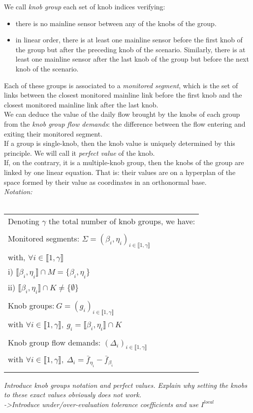 We call \emph{knob group} each set of knob indices verifying:
\begin{itemize}
	\item there is no mainline sensor between any of the knobs of the group.
	\item in linear order, there is at least one mainline sensor before the first knob of the group but after the preceding knob of the scenario. Similarly, there is at least one mainline sensor after the last knob of the group but before the next knob of the scenario.
\end{itemize}
Each of these groups is associated to a \emph{monitored segment}, which is the set of links between the closest monitored mainline link before the first knob and the closest monitored mainline link after the last knob.\\
We can deduce the value of the daily flow brought by the knobs of each group from the \emph{knob group flow demands}: the difference between the flow entering and exiting their monitored segment.\\
If a group is single-knob, then the knob value is uniquely determined by this principle. We will call it \emph{perfect value} of the knob.\\
If, on the contrary, it is a multiple-knob group, then the knobs of the group are linked by one linear equation. That is: their values are on a hyperplan of the space formed by their value as coordinates in an orthonormal base.\\
\emph{Notation:}\\
\\
\begin{tabular}{l}
	Denoting $\gamma$ the total number of knob groups, we have:\\
	\\

	Monitored segments: $\Sigma =(\beta_{i},\eta_{i})_{i \in \llbracket 1,\gamma \rrbracket} $ \\
	with, $\forall i\in \llbracket 1, \gamma \rrbracket $\\
		i) $ \llbracket \beta_{i},\eta_{i} \rrbracket \cap M=\{\beta_{i},\eta_{i}\} $\\
		ii)  $\llbracket \beta_{i}, \eta_{i} \rrbracket \cap K\not= \{\emptyset \}$\\
	\\
		Knob groups:$\ G=(g_{i})_{i\in \llbracket 1,\gamma \rrbracket}$\\
	with $\forall i \in \llbracket 1, \gamma \rrbracket,\ g_{i}=\llbracket \beta_{i}, \eta_{i} \rrbracket \cap K $\\
	\\
	Knob group flow demands: $ (\Delta_{i})_{i\in \llbracket 1,\gamma \rrbracket} $\\
	with $\forall i \in \llbracket 1,\gamma \rrbracket,\  \Delta_{i} =\bar{f}_{\eta_{i}}-\bar{f}_{\beta_{i}}$\\
	\\
\end{tabular}

\emph{
Introduce knob groups notation and perfect values. Explain why setting the knobs to these exact values obviously does not work.\\
->Introduce under/over-evaluation tolerance coefficients and use $I^{local}$}


